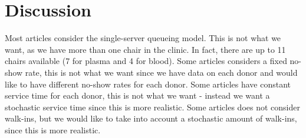 \documentclass[a4paper,12pt]{article}
\begin{document}
\section*{Discussion}


Most articles consider the single-server queueing model. This is not what we want, as we have more than one chair in the clinic. In fact, there are up to 11 chairs available (7 for plasma and 4 for blood). Some articles considers a fixed no-show rate, this is not what we want since we have data on each donor and would like to have different no-show rates for each donor. Some articles have constant service time for each donor, this is not what we want - instead we want a stochastic service time since this is more realistic. Some articles does not consider walk-ins, but we would like to take into account a stochastic amount of walk-ins, since this is more realistic. 






\end{document}
